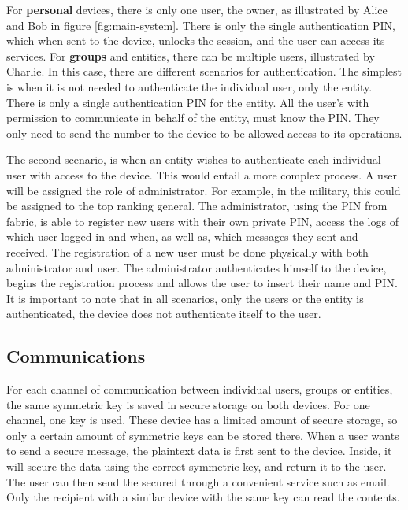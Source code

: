 For \textbf{personal} devices, there is only one user, the owner, as illustrated by Alice and Bob in figure \ref{fig:main-system}. There is only the single authentication \ac{PIN}, which when sent to the device, unlocks the session, and the user can access its services.
For \textbf{groups} and entities, there can be multiple users, illustrated by Charlie. In this case, there are different scenarios for authentication.
The simplest is when it is not needed to authenticate the individual user, only the entity. There is only a single authentication \ac{PIN} for the entity. All the user's with permission to communicate in behalf of the entity, must know the \ac{PIN}. They only need to send the number to the device to be allowed access to its operations.

The second scenario, is when an entity wishes to authenticate each individual user with access to the device. 
This would entail a more complex process. A user will be assigned the role of administrator. For example, in the military, this could be assigned to the top ranking general. The administrator, using the \ac{PIN} from fabric, is able to register new users with their own private \ac{PIN}, access the logs of which user logged in and when, as well as, which messages they sent and received.
The registration of a new user must be done physically with both administrator and user. The administrator authenticates himself to the device, begins the registration process and allows the user to insert their name and \ac{PIN}.
It is important to note that in all scenarios, only the users or the entity is authenticated, the device does not authenticate itself to the user.

\subsection{Communications}\label{chap:problem:scenarios:comms}

For each channel of communication between individual users, groups or entities, the same symmetric key is saved in secure storage on both devices. For one channel, one key is used.
These device has a limited amount of secure storage, so only a certain amount of symmetric keys can be stored there.
When a user wants to send a secure message, the plaintext data is first sent to the device. Inside, it will secure the data using the correct symmetric key, and return it to the user. The user can then send the secured through a convenient service such as email. Only the recipient with a similar device with the same key can read the contents.

